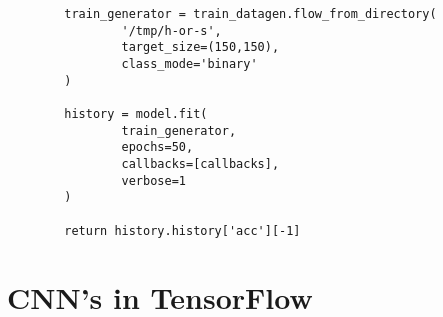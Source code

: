 \documentclass[11pt, a4paper]{article}
\begin{document}
\begin{spacing}{1.1}
\begin{lstlisting}
		train_generator = train_datagen.flow_from_directory(
				'/tmp/h-or-s',
				target_size=(150,150),
				class_mode='binary'
		)

		history = model.fit(
				train_generator,
				epochs=50,
				callbacks=[callbacks],
				verbose=1
		)
		
		return history.history['acc'][-1] \end{lstlisting}\newpage

	\section{CNN's in TensorFlow}
	
	
	
	
	
	
	
	
	
	
	
	
	
	
	
	
	
	
	
	
	
	
	
	
	
	
	
	
	
	
\end{spacing}
\end{document}
